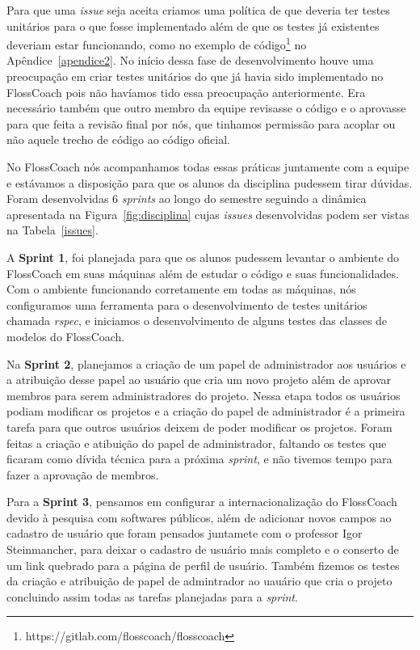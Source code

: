 Para que uma \textit{issue} seja aceita criamos uma política de que deveria ter
testes unitários para o que fosse implementado além de que os testes já existentes
deveriam estar funcionando, como no exemplo de código\footnote{https://gitlab.com/flosscoach/flosscoach} 
no Apêndice~\ref{apendice2}.
No início dessa fase de desenvolvimento houve uma preocupação 
em criar testes unitários do que já havia sido implementado no FlossCoach pois 
não havíamos tido essa preocupação anteriormente. Era necessário também que outro 
membro da equipe revisasse o código e o aprovasse para que feita a revisão final
por nós, que tinhamos permissão para acoplar ou não aquele trecho de código ao
código oficial. 

No FlossCoach nós acompanhamos todas essas práticas juntamente com a equipe e estávamos
a disposição para que os alunos da disciplina pudessem tirar dúvidas. Foram desenvolvidas
6 \textit{sprints} ao longo do semestre seguindo a dinâmica apresentada na Figura~\ref{fig:disciplina} 
cujas \textit{issues} desenvolvidas podem ser vistas na Tabela~\ref{issues}.

A \textbf{Sprint 1}, foi planejada para que os alunos pudessem levantar o ambiente
do FlossCoach em suas máquinas além de estudar o código e suas funcionalidades. Com o
ambiente funcionando corretamente em todas as máquinas, nós configuramos uma ferramenta
para o desenvolvimento de testes unitários chamada \textit{rspec}, e iniciamos o 
desenvolvimento de alguns testes das classes de modelos do FlossCoach. 

Na \textbf{Sprint 2}, planejamos a criação de um papel de administrador aos usuários
e a atribuição desse papel ao usuário que cria um novo projeto além de aprovar 
membros para serem administradores do projeto. Nessa etapa todos os usuários podiam
modificar os projetos e a criação do papel de administrador é a primeira tarefa 
para que outros usuários deixem de poder modificar os projetos. Foram feitas a 
criação e atibuição do papel de administrador, faltando os testes que
ficaram como dívida técnica para a próxima \textit{sprint}, e não tivemos tempo para fazer a 
aprovação de membros. 

Para a \textbf{Sprint 3}, pensamos em configurar a internacionalização do FlossCoach
devido à pesquisa com softwares públicos, além de adicionar novos campos ao cadastro 
de usuário que foram pensados juntamete com o professor Igor Steinmancher, para deixar o cadastro de usuário 
mais completo e o conserto de um link quebrado para a página de perfil de usuário.
Também fizemos os testes da criação e atribuição de papel de admintrador ao uauário
que cria o projeto concluindo assim todas as tarefas planejadas para a \textit{sprint}.

